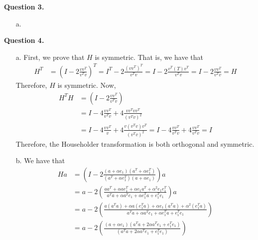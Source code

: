 \documentclass{article}
\begin{document}
\textbf{Question 3.}
\begin{itemize}
    \item[a.] 
    \item[] 
\end{itemize}

\textbf{Question 4.}
\begin{itemize}
    \item[a.] First, we prove that $H$ is symmetric. That is, we have that 
    \begin{align*}
        H^T &= (I -2\frac{vv^T}{v^Tv})^T = I^T -2\frac{(vv^T)^T}{v^Tv} = I -2\frac{v^T(T)v^T}{v^Tv} = I-2\frac{vv^T}{v^Tv} = H
    \end{align*}
    Therefore, $H$ is symmetric. Now,
    \begin{align*}
        H^TH &= \left(I -2\frac{vv^T}{v^Tv}\right) \\
        &= I-4\frac{vv^T}{v^Tv}+4\frac{vv^Tvv^T}{(v^Tv)^2}\\
        &= I-4\frac{vv^T}{v}+4\frac{v(v^Tv)v^T}{(v^Tv)^2} = I-4\frac{vv^T}{v^Tv}+4\frac{vv^T}{v^Tv} = I
    \end{align*}
    Therefore, the Householder transformation is both orthogonal and symmetric. 
    \item[b.] We have that 
    \begin{align*}
        Ha &=\left(I-2\frac{(a+\alpha e_1)(a^T+\alpha e_1^T)}{(a^T+\alpha e_1^T)(a+\alpha e_1)}\right)a\\
        &= a-2 \left(\frac{aa^T+\alpha ae_1^T+\alpha e_1 a^T+\alpha^2 e_1e_1^T}{a^T a+\alpha a^T e_1 + \alpha e_1^T a + e_1^T e_1}\right)a \\
        &=a-2\left(\frac{a(a^Ta)+\alpha a(e_1^T a) + \alpha e_1 (a^T a)+\alpha^2(e_1^T a)}{a^T a+\alpha a^T e_1 + \alpha e_1^T a + e_1^T e_1}\right)\\
        &=a-2\left(\frac{(a+\alpha e_1)(a^T a +2\alpha a^Te_1 + e_1^T e_1)}{(a^T a +2\alpha a^Te_1 + e_1^T e_1)}\right)\\
    \end{align*}  
\end{itemize}
\end{document}
